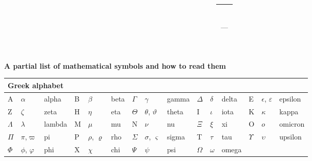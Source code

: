 \documentclass[11pt]{article}
\title{---}
\author{---}
\begin{document}

\begin{center}
{\Large \bf A partial list of mathematical symbols and how to read them}
\end{center}

\begin{tabular}{|l l l|l l l|l l l|l l l|l l l|}
\multicolumn{8}{l}{\bf Greek alphabet}
\\ \hline
A          & $\alpha$                  & alpha     &
B          & $\beta$                   & beta      &
$\Gamma$   & $\gamma$                  & gamma     &
$\Delta$   & $\delta$                  & delta     &
E          & $\epsilon$, $\varepsilon$ & epsilon   \\ \hline
Z          & $\zeta$                   & zeta      &
H          & $\eta$                    & eta       &
$\Theta$   & $\theta$, $\vartheta$     & theta     &
I          & $\iota$                   & iota      &
K          & $\kappa$                  & kappa     \\ \hline
$\Lambda$  & $\lambda$                 & lambda    &
M          & $\mu$                     & mu        &
N          & $\nu$                     & nu        &
$\Xi$      & $\xi$                     & xi        &
O          & $o$                       & omicron   \\ \hline
$\Pi$      & $\pi$,$\varpi$            & pi        &
P          & $\rho$, $\varrho$         & rho       &
$\Sigma$   & $\sigma$, $\varsigma$     & sigma     &
T          & $\tau$                    & tau       &
$\Upsilon$ & $\upsilon$                & upsilon   \\ \hline
$\Phi$     & $\phi$, $\varphi$         & phi       &
X          & $\chi$                    & chi       &
$\Psi$     & $\psi$                    & psi       &
$\Omega$   & $\omega$                  & omega     & & & \\ \hline
\end{tabular}
\end{document}
